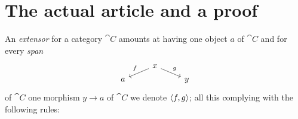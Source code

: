 
\section{The actual article and a proof}


An {\em extensor}  for a category \(\cat C\) amounts at having one object \(a\) of \(\cat C\) and for every {\em span}
\[\begin{tikzcd}[row sep=tiny]
& x \ar["f", dl, swap] \ar["g", dr] & \\
a & & y
\end{tikzcd}\]
of \(\cat C\) one morphism \(y \to a\) of \(\cat C\) we denote \(\left\langle f, g\right\rangle\); all this complying with the following rules:
